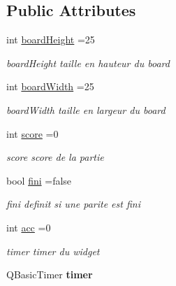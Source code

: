 \subsection*{Public Attributes}
\begin{DoxyCompactItemize}
\item 
int \hyperlink{class_board_a81859b3ab8f00f4c74fd89d0db0ca412}{board\+Height} =25\hypertarget{class_board_a81859b3ab8f00f4c74fd89d0db0ca412}{}\label{class_board_a81859b3ab8f00f4c74fd89d0db0ca412}

\begin{DoxyCompactList}\small\item\em board\+Height taille en hauteur du board \end{DoxyCompactList}\item 
int \hyperlink{class_board_a3aa771a6eb106b66525123a3d72ab1b7}{board\+Width} =25\hypertarget{class_board_a3aa771a6eb106b66525123a3d72ab1b7}{}\label{class_board_a3aa771a6eb106b66525123a3d72ab1b7}

\begin{DoxyCompactList}\small\item\em board\+Width taille en largeur du board \end{DoxyCompactList}\item 
int \hyperlink{class_board_a7a44f4be355783a0136e42c79733724a}{score} =0\hypertarget{class_board_a7a44f4be355783a0136e42c79733724a}{}\label{class_board_a7a44f4be355783a0136e42c79733724a}

\begin{DoxyCompactList}\small\item\em score score de la partie \end{DoxyCompactList}\item 
bool \hyperlink{class_board_afdb871d4bd6f37e1a98564745d762420}{fini} =false\hypertarget{class_board_afdb871d4bd6f37e1a98564745d762420}{}\label{class_board_afdb871d4bd6f37e1a98564745d762420}

\begin{DoxyCompactList}\small\item\em fini definit si une parite est fini \end{DoxyCompactList}\item 
int \hyperlink{class_board_a424cefa1387e098268b6be64e738ca31}{acc} =0
\begin{DoxyCompactList}\small\item\em timer timer du widget \end{DoxyCompactList}\item 
Q\+Basic\+Timer {\bfseries timer}\hypertarget{class_board_a2ff086910f4575f5fdfb1378c56f262f}{}\label{class_board_a2ff086910f4575f5fdfb1378c56f262f}


\end{DoxyCompactItemize}
